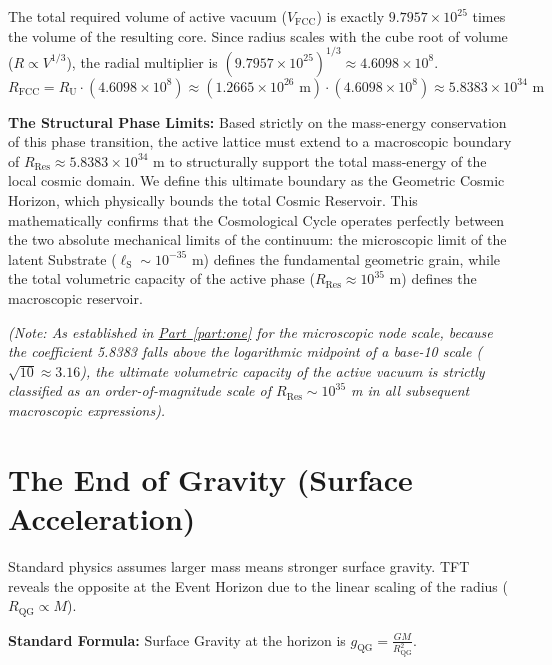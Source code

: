 The total required volume of active vacuum ($V_{\mathrm{FCC}}$) is exactly $9.7957 \times 10^{25}$ times the volume of the resulting core. Since radius scales with the cube root of volume ($R \propto V^{1/3}$), the radial multiplier is $(9.7957 \times 10^{25})^{1/3} \approx 4.6098 \times 10^8$.
\begin{equation}
    R_{\mathrm{FCC}} = R_{\mathrm{U}} \cdot (4.6098 \times 10^8) \approx (1.2665 \times 10^{26} \text{ m}) \cdot (4.6098 \times 10^8) \approx 5.8383 \times 10^{34} \text{ m}
\end{equation}

\vspace{0.5em}
\noindent\textbf{The Structural Phase Limits:} Based strictly on the mass-energy conservation of this phase transition, the active lattice must extend to a macroscopic boundary of $R_{\mathrm{Res}} \approx 5.8383 \times 10^{34}$ m to structurally support the total mass-energy of the local cosmic domain. We define this ultimate boundary as the Geometric Cosmic Horizon, which physically bounds the total Cosmic Reservoir. This mathematically confirms that the Cosmological Cycle operates perfectly between the two absolute mechanical limits of the continuum: the microscopic limit of the latent Substrate ($\ell_{\mathrm{S}} \sim 10^{-35}$ m) defines the fundamental geometric grain, while the total volumetric capacity of the active phase ($R_{\mathrm{Res}} \approx 10^{35}$ m) defines the macroscopic reservoir. 

\vspace{0.5em}
\noindent \textit{(Note: As established in \hyperref[part:one]{Part~\ref{part:one}} for the microscopic node scale, because the coefficient 5.8383 falls above the logarithmic midpoint of a base-10 scale ($\sqrt{10} \approx 3.16$), the ultimate volumetric capacity of the active vacuum is strictly classified as an order-of-magnitude scale of $R_{\mathrm{Res}} \sim 10^{35}$ m in all subsequent macroscopic expressions).}

\vspace{0.5em}
\section{The End of Gravity (Surface Acceleration)}
Standard physics assumes larger mass means stronger surface gravity. TFT reveals the opposite at the Event Horizon due to the linear scaling of the radius ($R_{\mathrm{QG}} \propto M$).

\vspace{0.5em}
\noindent\textbf{Standard Formula:} Surface Gravity at the horizon is $g_{\mathrm{QG}} = \frac{GM}{R_{\mathrm{QG}}^2}$.

